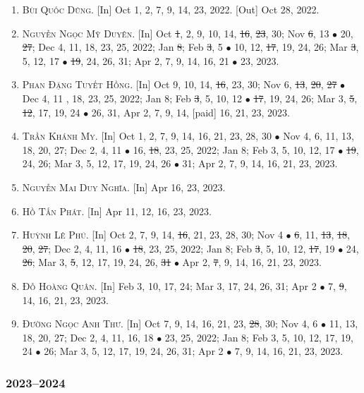 \documentclass{article}
\begin{document}
\begin{enumerate}
	\item \textsc{Bùi Quốc Dũng.} \textsf{[In]} Oct 1, 2, 7, 9, 14, 23, 2022. \textsf{[Out]} Oct 28, 2022.
	\item \textsc{Nguyễn Ngọc Mỹ Duyên.} \textsf{[In]} Oct \st{1}, 2, 9, 10, 14, \st{16}, \st{23}, 30; Nov \st{6}, 13 $\bullet$ 20, \st{27}; Dec 4, 11, 18, 23, 25, 2022; Jan \st{8}; Feb \st{3}, 5 $\bullet$ 10, 12, \st{17}, 19, 24, 26; Mar \st{3}, 5, 12, 17 $\bullet$ \st{19}, 24, 26, 31; Apr 2, 7, 9, 14, 16, 21 $\bullet$ 23, 2023.
	\item \textsc{Phan Đặng Tuyết Hồng.} \textsf{[In]} Oct 9, 10, 14, \st{16}, 23, 30; Nov 6, \st{13}, \st{20}, \st{27} $\bullet$ Dec 4, 11 , 18, 23, 25, 2022; Jan 8; Feb \st{3}, 5, 10, 12 $\bullet$ \st{17}, 19, 24, 26; Mar 3, \st{5}, \st{12}, 17, 19, 24 $\bullet$ 26, 31, Apr 2, 7, 9, 14, [paid] 16, 21, 23, 2023.
	\item \textsc{Trần Khánh My.} \textsf{[In]} Oct 1, 2, 7, 9, 14, 16, 21, 23, 28, 30 $\bullet$ Nov 4, 6, 11, 13, 18, 20, 27; Dec 2, 4, 11 $\bullet$ 16, \st{18}, 23, 25, 2022; Jan 8; Feb 3, 5, 10, 12, 17 $\bullet$ \st{19}, 24, 26; Mar 3, 5, 12, 17, 19, 24, 26 $\bullet$ 31; Apr 2, 7, 9, 14, 16, 21, 23, 2023.
	\item \textsc{Nguyễn Mai Duy Nghĩa.} \textsf{[In]} Apr 16, 23, 2023.
	\item \textsc{Hồ Tấn Phát.} \textsf{[In]} Apr 11, 12, 16, 23, 2023.
	\item \textsc{Huỳnh Lê Phú.} \textsf{[In]} Oct 2, 7, 9, 14, \st{16}, 21, 23, 28, 30; Nov 4 $\bullet$ \st{6}, 11, \st{13}, \st{18}, \st{20}, \st{27}; Dec 2, 4, 11, 16 $\bullet$ \st{18}, 23, 25, 2022; Jan 8; Feb \st{3}, 5, 10, 12, \st{17}, 19 $\bullet$ 24, \st{26}; Mar 3, \st{5}, 12, 17, 19, 24, 26, \st{31} $\bullet$ Apr 2, \st{7}, 9, 14, 16, 21, 23, 2023.
	\item \textsc{Đỗ Hoàng Quân.} \textsf{[In]} Feb 3, 10, 17, 24; Mar 3, 17, 24, 26, 31; Apr 2 $\bullet$ 7, \st{9}, 14, 16, 21, 23, 2023.
	\item \textsc{Đường Ngọc Anh Thư.} \textsf{[In]} Oct 7, 9, 14, 16, 21, 23, \st{28}, 30; Nov 4, 6 $\bullet$ 11, 13, 18, 20, 27; Dec 2, 4, 11, 16, 18 $\bullet$ 23, 25, 2022; Jan 8; Feb 3, 5, 10, 12, 17, 19, 24 $\bullet$ 26; Mar 3, 5, 12, 17, 19, 24, 26, 31; Apr 2 $\bullet$ 7, 9, 14, 16, 21, 23, 2023.
\end{enumerate}

\subsubsection{2023--2024}
\end{document}
